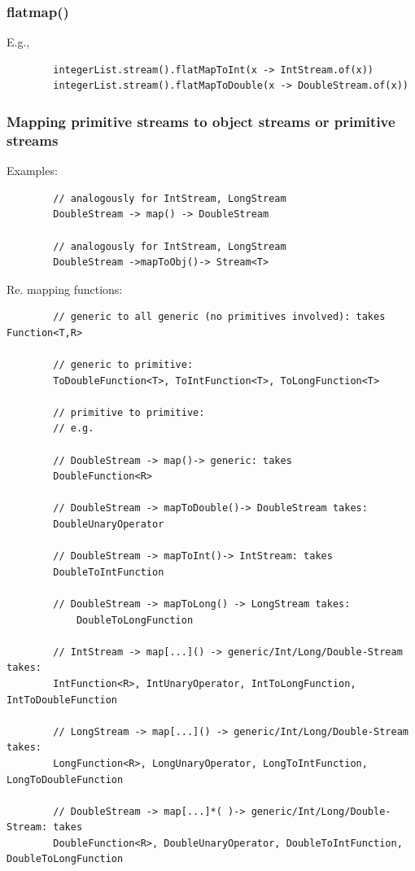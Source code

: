 \documentclass{scrartcl}
\begin{document}
\subsubsection{flatmap()}

    E.g.,

    \begin{lstlisting}
        integerList.stream().flatMapToInt(x -> IntStream.of(x))
        integerList.stream().flatMapToDouble(x -> DoubleStream.of(x))
    \end{lstlisting}

\subsubsection{Mapping primitive streams to object streams or primitive streams}

    Examples:

    \begin{lstlisting}
        // analogously for IntStream, LongStream
        DoubleStream -> map() -> DoubleStream

        // analogously for IntStream, LongStream
        DoubleStream ->mapToObj()-> Stream<T>

    \end{lstlisting}

    Re. mapping functions:

    \begin{lstlisting}
        // generic to all generic (no primitives involved): takes Function<T,R>

        // generic to primitive:
        ToDoubleFunction<T>, ToIntFunction<T>, ToLongFunction<T>

        // primitive to primitive:
        // e.g.

        // DoubleStream -> map()-> generic: takes
        DoubleFunction<R>

        // DoubleStream -> mapToDouble()-> DoubleStream takes:
        DoubleUnaryOperator

        // DoubleStream -> mapToInt()-> IntStream: takes
        DoubleToIntFunction

        // DoubleStream -> mapToLong() -> LongStream takes:
            DoubleToLongFunction

        // IntStream -> map[...]() -> generic/Int/Long/Double-Stream takes:
        IntFunction<R>, IntUnaryOperator, IntToLongFunction, IntToDoubleFunction

        // LongStream -> map[...]() -> generic/Int/Long/Double-Stream takes:
        LongFunction<R>, LongUnaryOperator, LongToIntFunction, LongToDoubleFunction

        // DoubleStream -> map[...]*( )-> generic/Int/Long/Double-Stream: takes
        DoubleFunction<R>, DoubleUnaryOperator, DoubleToIntFunction, DoubleToLongFunction
    \end{lstlisting}
\end{document}
